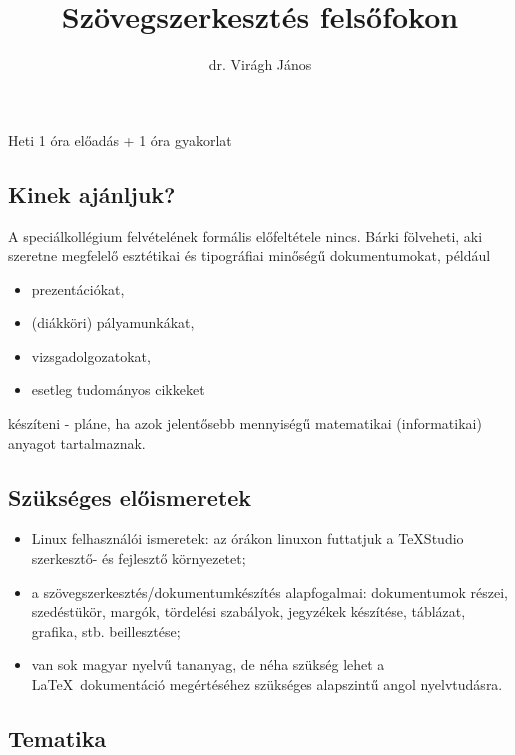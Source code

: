 \documentclass{article}
\date{}
\title{Szövegszerkesztés felsőfokon}
\author{dr. Virágh János}
\begin{document}
	
\maketitle	

\noindent Heti 1 óra előadás + 1 óra gyakorlat

\subsection*{Kinek ajánljuk?}

A speciálkollégium felvételének formális előfeltétele nincs. Bárki fölveheti, aki szeretne megfelelő esztétikai és tipográfiai minőségű dokumentumokat, például 

\begin{itemize}
	\item prezentációkat,
	\item (diákköri) pályamunkákat,
	\item vizsgadolgozatokat,
	\item esetleg tudományos cikkeket
	\end{itemize} 
	
készíteni - pláne, ha azok jelentősebb mennyiségű matematikai (informatikai) anyagot tartalmaznak.

\subsection*{Szükséges előismeretek}

\begin{itemize}
	\item Linux felhasználói ismeretek: az órákon linuxon  futtatjuk a TeXStudio szerkesztő- és fejlesztő környezetet;
	\item a szövegszerkesztés/dokumentumkészítés alapfogalmai: dokumentumok részei, szedéstükör, margók, tördelési szabályok, jegyzékek készítése, táblázat, grafika, stb. beillesztése;
	\item van sok magyar nyelvű tananyag, de  néha szükség lehet a  \LaTeX\  dokumentáció megértéséhez szükséges alapszintű angol nyelvtudásra.
\end{itemize}

\subsection*{Tematika}
\end{document}
